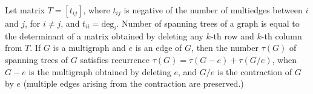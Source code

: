  Let matrix $T = [t_{ij}]$, where $t_{ij}$ is negative of the number of
multiedges between $i$ and $j$, for $i \ne j$, and $t_{ii} = \mbox{deg}_i$.
Number of spanning trees of a graph is equal to the determinant of
a matrix obtained by deleting any $k$-th row and $k$-th column from $T$.
If $G$ is a multigraph and $e$ is an edge of $G$, then the number $\tau(G)$ of
spanning trees of $G$ satisfies recurrence $\tau(G) = \tau(G-e) + \tau(G/e)$,
when $G-e$ is the multigraph obtained by deleting $e$, and $G/e$ is
the contraction of $G$ by $e$ (multiple edges arising from the contraction
are preserved.)

